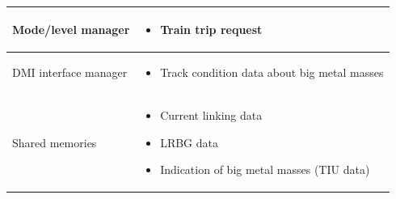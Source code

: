 \documentclass[nocc]{template/openetcs_report}
\begin{document}
\begin{longtable}{|l|l|}
				\hline	
									
					\begin{minipage}[t]{0.35\linewidth} Mode/level manager	\end{minipage} 
				&	\begin{minipage}[t]{0.65\linewidth}
						\begin{itemize}
							\item Train trip request
						\end{itemize}			
					\end{minipage} \\
				
				\hline
														
					\begin{minipage}[t]{0.35\linewidth} DMI interface manager	\end{minipage} 
				&	\begin{minipage}[t]{0.65\linewidth}
						\begin{itemize}
							\item Track condition data about big metal masses
						\end{itemize}			
					\end{minipage} \\
				
				\hline																
				
					\begin{minipage}[t]{0.35\linewidth} Shared memories	\end{minipage} 
				&	\begin{minipage}[t]{0.65\linewidth}
						\begin{itemize}
							\item Current linking data
							\item LRBG data
							\item Indication of big metal masses (TIU data)						
						\end{itemize}				
					\end{minipage} \\
				
				\hline	
			\end{longtable}
\newpage				
\end{document}
